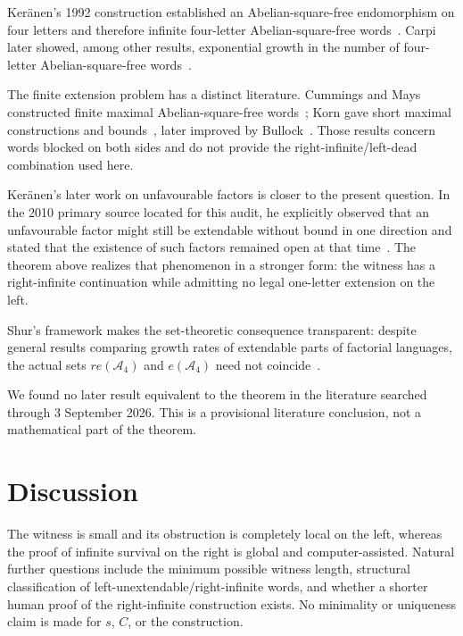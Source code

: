 \documentclass[11pt]{article}
\theoremstyle{definition}
\newcommand{\A}{\mathcal A_4}
\begin{document}
Ker\"anen's 1992 construction established an Abelian-square-free endomorphism on four letters and therefore infinite four-letter Abelian-square-free words~\cite{Keranen1992}. Carpi later showed, among other results, exponential growth in the number of four-letter Abelian-square-free words~\cite{Carpi1998}.

The finite extension problem has a distinct literature. Cummings and Mays constructed finite maximal Abelian-square-free words~\cite{CummingsMays2001}; Korn gave short maximal constructions and bounds~\cite{Korn2003}, later improved by Bullock~\cite{Bullock2004}. Those results concern words blocked on both sides and do not provide the right-infinite/left-dead combination used here.

Ker\"anen's later work on unfavourable factors is closer to the present question. In the 2010 primary source located for this audit, he explicitly observed that an unfavourable factor might still be extendable without bound in one direction and stated that the existence of such factors remained open at that time~\cite{Keranen2010}. The theorem above realizes that phenomenon in a stronger form: the witness has a right-infinite continuation while admitting no legal one-letter extension on the left.

Shur's framework makes the set-theoretic consequence transparent: despite general results comparing growth rates of extendable parts of factorial languages, the actual sets $re(\A)$ and $e(\A)$ need not coincide~\cite{Shur2008}.

We found no later result equivalent to the theorem in the literature searched through 3 September 2026. This is a provisional literature conclusion, not a mathematical part of the theorem.

\section{Discussion}

The witness is small and its obstruction is completely local on the left, whereas the proof of infinite survival on the right is global and computer-assisted. Natural further questions include the minimum possible witness length, structural classification of left-unextendable/right-infinite words, and whether a shorter human proof of the right-infinite construction exists. No minimality or uniqueness claim is made for $s$, $C$, or the construction.

\appendix
\end{document}
